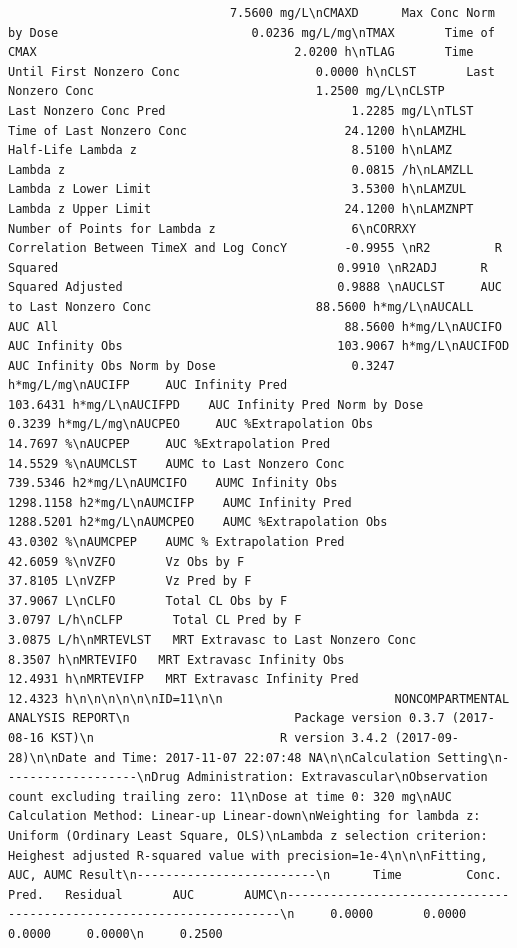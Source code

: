 \documentclass[12pt,]{krantz}
\theoremstyle{definition}
\theoremstyle{definition}
\theoremstyle{definition}
\theoremstyle{remark}
\begin{document}
\begin{verbatim}
                               7.5600 mg/L\nCMAXD      Max Conc Norm by Dose                           0.0236 mg/L/mg\nTMAX       Time of CMAX                                    2.0200 h\nTLAG       Time Until First Nonzero Conc                   0.0000 h\nCLST       Last Nonzero Conc                               1.2500 mg/L\nCLSTP      Last Nonzero Conc Pred                          1.2285 mg/L\nTLST       Time of Last Nonzero Conc                      24.1200 h\nLAMZHL     Half-Life Lambda z                              8.5100 h\nLAMZ       Lambda z                                        0.0815 /h\nLAMZLL     Lambda z Lower Limit                            3.5300 h\nLAMZUL     Lambda z Upper Limit                           24.1200 h\nLAMZNPT    Number of Points for Lambda z                   6\nCORRXY     Correlation Between TimeX and Log ConcY        -0.9955 \nR2         R Squared                                       0.9910 \nR2ADJ      R Squared Adjusted                              0.9888 \nAUCLST     AUC to Last Nonzero Conc                       88.5600 h*mg/L\nAUCALL     AUC All                                        88.5600 h*mg/L\nAUCIFO     AUC Infinity Obs                              103.9067 h*mg/L\nAUCIFOD    AUC Infinity Obs Norm by Dose                   0.3247 h*mg/L/mg\nAUCIFP     AUC Infinity Pred                             103.6431 h*mg/L\nAUCIFPD    AUC Infinity Pred Norm by Dose                  0.3239 h*mg/L/mg\nAUCPEO     AUC %Extrapolation Obs                         14.7697 %\nAUCPEP     AUC %Extrapolation Pred                        14.5529 %\nAUMCLST    AUMC to Last Nonzero Conc                     739.5346 h2*mg/L\nAUMCIFO    AUMC Infinity Obs                            1298.1158 h2*mg/L\nAUMCIFP    AUMC Infinity Pred                           1288.5201 h2*mg/L\nAUMCPEO    AUMC %Extrapolation Obs                        43.0302 %\nAUMCPEP    AUMC % Extrapolation Pred                      42.6059 %\nVZFO       Vz Obs by F                                    37.8105 L\nVZFP       Vz Pred by F                                   37.9067 L\nCLFO       Total CL Obs by F                               3.0797 L/h\nCLFP       Total CL Pred by F                              3.0875 L/h\nMRTEVLST   MRT Extravasc to Last Nonzero Conc              8.3507 h\nMRTEVIFO   MRT Extravasc Infinity Obs                     12.4931 h\nMRTEVIFP   MRT Extravasc Infinity Pred                    12.4323 h\n\n\n\n\n\nID=11\n\n                        NONCOMPARTMENTAL ANALYSIS REPORT\n                       Package version 0.3.7 (2017-08-16 KST)\n                          R version 3.4.2 (2017-09-28)\n\nDate and Time: 2017-11-07 22:07:48 NA\n\nCalculation Setting\n-------------------\nDrug Administration: Extravascular\nObservation count excluding trailing zero: 11\nDose at time 0: 320 mg\nAUC Calculation Method: Linear-up Linear-down\nWeighting for lambda z: Uniform (Ordinary Least Square, OLS)\nLambda z selection criterion: Heighest adjusted R-squared value with precision=1e-4\n\n\nFitting, AUC, AUMC Result\n-------------------------\n      Time         Conc.      Pred.   Residual       AUC       AUMC\n---------------------------------------------------------------------\n     0.0000       0.0000                           0.0000     0.0000\n     0.2500       
\end{verbatim}
\end{document}
